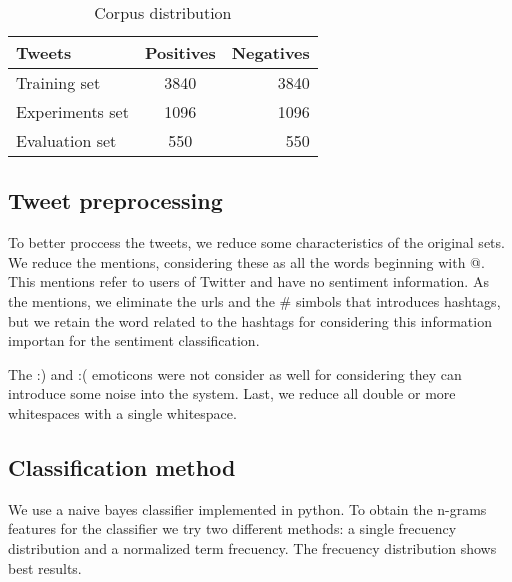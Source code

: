 \documentclass[12pt,journal,compsoc]{IEEEtran}
\begin{document}
\begin{table}
\renewcommand{\arraystretch}{1.3}
\begin{center}
\caption{Corpus distribution}
\begin{tabular}{l c r}
\hline
\textbf{Tweets} & \textbf{Positives} & \textbf{Negatives} \\
\hline
Training set &	3840 & 3840 \\
Experiments set & 1096 & 1096 \\
Evaluation set & 550 & 550 \\
\hline
\end{tabular}
\end{center}
\end{table}

\subsection{Tweet preprocessing}

To better proccess the tweets, we reduce some characteristics of the original sets. We reduce the mentions, considering these as all the words beginning with @. This mentions refer to users of Twitter and have no sentiment information. As the mentions, we eliminate the urls and the \# simbols that introduces hashtags, but we retain the word related to the hashtags for considering this information importan for the sentiment classification.

The :) and :( emoticons were not consider as well for considering they can introduce some noise into the system. Last, we reduce all double or more whitespaces with a single whitespace.

\subsection{Classification method}

We use a naive bayes classifier implemented in python. To obtain  the n-grams features for the classifier we try two different methods: a single frecuency distribution and a normalized term frecuency. The frecuency distribution shows best results.
\end{document}
